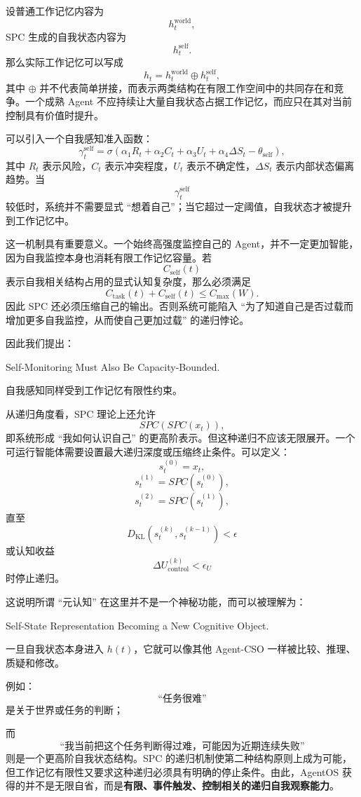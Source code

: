 设普通工作记忆内容为
\[
h_t^{\mathrm{world}},
\]
SPC 生成的自我状态内容为
\[
h_t^{\mathrm{self}}.
\]
那么实际工作记忆可以写成
\[
h_t
=
h_t^{\mathrm{world}}
\oplus
h_t^{\mathrm{self}},
\]
其中 $\oplus$ 并不代表简单拼接，而表示两类结构在有限工作空间中的共同存在和竞争。一个成熟 Agent 不应持续让大量自我状态占据工作记忆，而应只在其对当前控制具有价值时提升。

可以引入一个自我感知准入函数：
\[
\gamma_t^{\mathrm{self}}
=
\sigma
\left(
\alpha_1
R_t
+
\alpha_2
C_t
+
\alpha_3
U_t
+
\alpha_4
\Delta S_t
-
\theta_{\mathrm{self}}
\right),
\]
其中 $R_t$ 表示风险，$C_t$ 表示冲突程度，$U_t$ 表示不确定性，$\Delta S_t$ 表示内部状态偏离趋势。当
\[
\gamma_t^{\mathrm{self}}
\]
较低时，系统并不需要显式 ``想着自己''；当它超过一定阈值，自我状态才被提升到工作记忆中。

这一机制具有重要意义。一个始终高强度监控自己的 Agent，并不一定更加智能，因为自我监控本身也消耗有限工作记忆容量。若
\[
C_{\mathrm{self}}(t)
\]
表示自我相关结构占用的显式认知复杂度，那么必须满足
\[
C_{\mathrm{task}}(t)
+
C_{\mathrm{self}}(t)
\le
C_{\max}(W).
\]
因此 SPC 还必须压缩自己的输出。否则系统可能陷入 ``为了知道自己是否过载而增加更多自我监控，从而使自己更加过载'' 的递归悖论。

因此我们提出：
\begin{statementbox}
Self-Monitoring Must Also Be Capacity-Bounded.
\end{statementbox}
自我感知同样受到工作记忆有限性约束。

从递归角度看，SPC 理论上还允许
\[
SPC(SPC(x_t)),
\]
即系统形成 ``我如何认识自己'' 的更高阶表示。但这种递归不应该无限展开。一个可运行智能体需要设置最大递归深度或压缩终止条件。可以定义：
\[
s_t^{(0)}=x_t,
\]
\[
s_t^{(1)}=SPC(s_t^{(0)}),
\]
\[
s_t^{(2)}=SPC(s_t^{(1)}),
\]
直至
\[
D_{\mathrm{KL}}
\left(
s_t^{(k)},
s_t^{(k-1)}
\right)
<
\epsilon
\]
或认知收益
\[
\Delta U_{\mathrm{control}}^{(k)}
<
\epsilon_U
\]
时停止递归。

这说明所谓 ``元认知'' 在这里并不是一个神秘功能，而可以被理解为：
\begin{statementbox}
Self-State Representation Becoming a New Cognitive Object.
\end{statementbox}
一旦自我状态本身进入 $h(t)$，它就可以像其他 Agent-CSO 一样被比较、推理、质疑和修改。

例如：
\[
\text{``任务很难''}
\]
是关于世界或任务的判断；

而
\[
\text{``我当前把这个任务判断得过难，可能因为近期连续失败''}
\]
则是一个更高阶自我状态结构。SPC 的递归机制使第二种结构原则上成为可能，但工作记忆有限性又要求这种递归必须具有明确的停止条件。由此，AgentOS 获得的并不是无限自省，而是\textbf{有限、事件触发、控制相关的递归自我观察能力}。

